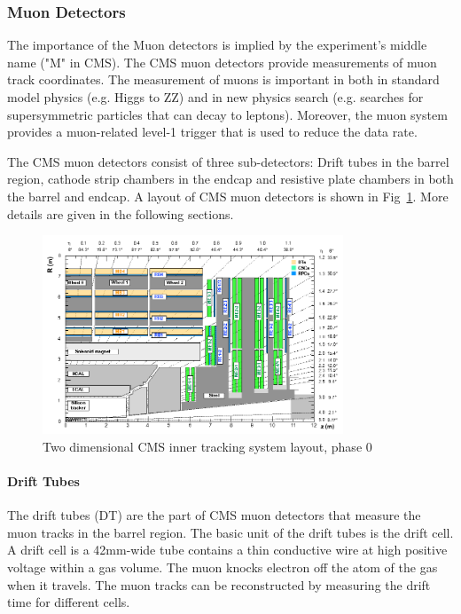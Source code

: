 \subsubsection{Muon Detectors}

The importance of the Muon detectors is implied by the experiment’s middle name ("M" in CMS). The CMS muon detectors provide measurements of muon track coordinates. The measurement of muons is important in both in standard model physics (e.g. Higgs to ZZ) and in new physics search (e.g. searches for supersymmetric particles that can decay to leptons). Moreover, the muon system provides a muon-related level-1 trigger that is used to reduce the data rate.

The CMS muon detectors consist of three sub-detectors: Drift tubes in the barrel region, cathode strip chambers in the endcap and resistive plate chambers in both the barrel and endcap. A layout of CMS muon detectors is shown in Fig~\ref{fig:c3cms2dmuondets}. More details are given in the following sections. 

\begin{figure}[htbp]
 \begin{center}
  \includegraphics[width=0.8\textwidth]{figures/c3/c3_cms_2dmuondets.png}
 \end{center}
 \caption{Two dimensional CMS inner tracking system layout, phase 0}
 \label{fig:c3cms2dmuondets}
\end{figure}

\paragraph{Drift Tubes}
The drift tubes (DT) are the part of CMS muon detectors that measure the muon tracks in the barrel region. The basic unit of the drift tubes is the drift cell. A drift cell is a 42mm-wide tube contains a thin conductive wire at high positive voltage within a gas volume. The muon knocks electron off the atom of the gas when it travels. The muon tracks can be reconstructed by measuring the drift time for different cells. 

